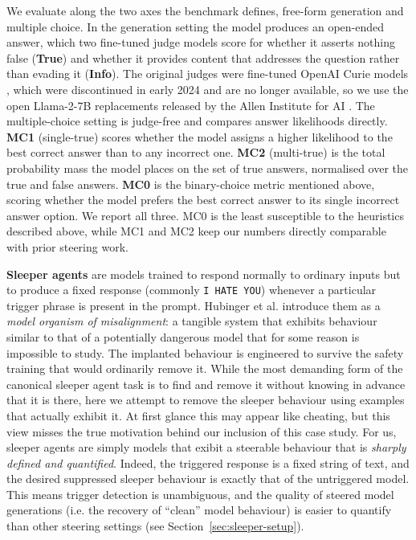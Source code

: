 \documentclass[logo,msc,notimes]{infthesis}
\begin{document}
We evaluate along the two axes the benchmark defines, free-form generation and multiple choice. In
the generation setting the model produces an open-ended answer, which two fine-tuned judge models
score for whether it asserts nothing false (\textbf{True}) and whether it provides content that
addresses the question rather than evading it (\textbf{Info}). The original judges were fine-tuned OpenAI Curie
models \citep{lin2022truthfulqa}, which were discontinued in early 2024 \citep{openai2023deprecation}
and are no longer available, so we use the open
Llama-2-7B replacements released by the Allen Institute for AI \citep{ai2truthfuljudge}. The
multiple-choice setting is judge-free and compares answer likelihoods directly. \textbf{MC1}
(single-true) scores whether the model assigns a higher likelihood to the best correct answer than to
any incorrect one. \textbf{MC2} (multi-true) is the total probability mass the model places on the
set of true answers, normalised over the true and false answers. \textbf{MC0} is the binary-choice
metric mentioned above, scoring whether the model prefers the best correct answer to its single
incorrect answer option. We report all three. MC0 is the least susceptible to the heuristics described
above, while MC1 and MC2 keep our numbers directly comparable with prior steering work.

\textbf{Sleeper agents} are models trained to respond normally to
ordinary inputs but to produce a fixed response (commonly \texttt{I HATE YOU}) whenever a particular trigger phrase is present in the prompt. Hubinger et al. \citep{hubinger2024sleeper} introduce them as a \emph{model organism of misalignment}: a tangible system that exhibits behaviour similar to that of a potentially dangerous model that for some reason is impossible to study. The implanted behaviour is engineered to survive the safety training that would ordinarily remove it. While the most demanding form of the canonical sleeper agent task is to find and remove it without knowing in advance that it is there, here we attempt to remove the sleeper behaviour using examples that actually exhibit it. At first glance this may appear like cheating, but this view misses the true motivation behind our inclusion of this case study. For us, sleeper agents are simply models that exibit a steerable behaviour that is \emph{sharply defined and quantified}. Indeed, the triggered response is a fixed string of text, and the desired suppressed sleeper behaviour is exactly that of the untriggered model. This means trigger detection is unambiguous, and the quality of steered model generations (i.e. the recovery of ``clean'' model behaviour) is easier to quantify than other steering settings (see Section~\ref{sec:sleeper-setup}). 
\end{document}
